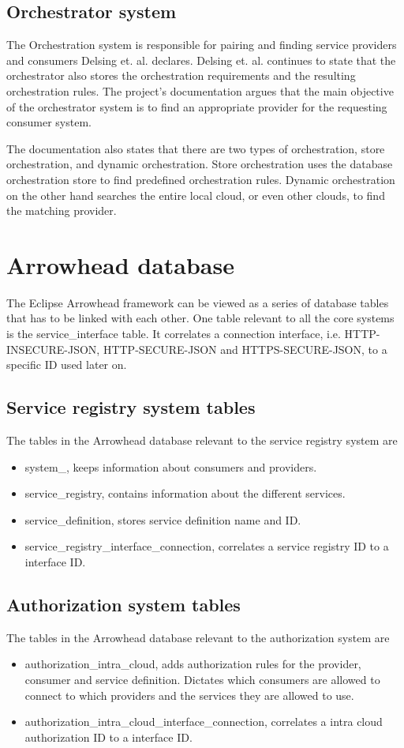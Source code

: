 \subsection{Orchestrator system}
The Orchestration system is responsible for pairing and finding service providers and consumers Delsing et. al. declares.
Delsing et. al. continues to state that the orchestrator also stores the orchestration requirements and the resulting orchestration rules.\cite{Delsing2017} 
The project's documentation argues that the main objective of the orchestrator system is to find an appropriate provider for the requesting consumer system.\cite{Github2021}

The documentation also states that there are two types of orchestration, store orchestration, and dynamic orchestration.
Store orchestration uses the database orchestration store to find predefined orchestration rules.
Dynamic orchestration on the other hand searches the entire local cloud, or even other clouds, to find the matching provider.\cite{Github2021}
\section{Arrowhead database}
The Eclipse Arrowhead framework can be viewed as a series of database tables that has to be linked with each other.
One table relevant to all the core systems is the service\_interface table.
It correlates a connection interface, i.e. HTTP-INSECURE-JSON, HTTP-SECURE-JSON and HTTPS-SECURE-JSON, to a specific ID used later on.
\subsection{Service registry system tables}
The tables in the Arrowhead database relevant to the service registry system are
\begin{itemize}
    \item system\_, keeps information about consumers and providers. 
    \item service\_registry, contains information about the different services.
    \item service\_definition, stores service definition name and ID.
    \item service\_registry\_interface\_connection, correlates a service registry ID to a interface ID.
\end{itemize}
\subsection{Authorization system tables}
The tables in the Arrowhead database relevant to the authorization system are
\begin{itemize}
    \item authorization\_intra\_cloud,  adds authorization rules for the provider, consumer and service definition. Dictates which consumers are allowed to connect to which providers and the services they are allowed to use.
    \item authorization\_intra\_cloud\_interface\_connection,  correlates a intra cloud authorization ID to a interface ID.
\end{itemize}
